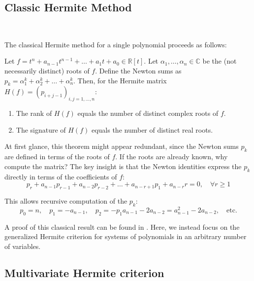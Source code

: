 \documentclass{amsart}
\begin{document}
\vspace{1em}

\subsection{Classic Hermite Method}~

The classical Hermite method for a single polynomial proceeds as follows:

\begin{theorem}
Let $f = t^n + a_{n-1} t^{n-1} + \ldots + a_1 t + a_0 \in \mathbb{R}[t]$. Let $\alpha_1, \ldots, \alpha_n \in \mathbb{C}$ be the (not necessarily distinct) roots of $f$. Define the Newton sums as $p_k = \alpha_1^k + \alpha_2^k + \ldots + \alpha_n^k$. Then, for the Hermite matrix $H(f) = (p_{i+j-1})_{i,j = 1,\ldots,n}$:
\begin{enumerate}
    \item The rank of $H(f)$ equals the number of distinct complex roots of $f$.
    \item The signature of $H(f)$ equals the number of distinct real roots.
\end{enumerate}
\end{theorem}

At first glance, this theorem might appear redundant, since the Newton sums $p_k$ are defined in terms of the roots of $f$. If the roots are already known, why compute the matrix? The key insight is that the Newton identities express the $p_k$ directly in terms of the coefficients of $f$:
\[
p_r + a_{n-1} p_{r-1} + a_{n-2} p_{r-2} + \ldots + a_{n-r+1} p_1 + a_{n-r} r = 0, \quad \forall r \ge 1
\]

This allows recursive computation of the $p_k$:
\[
p_0 = n,\quad p_1 = -a_{n-1},\quad p_2 = -p_1 a_{n-1} - 2a_{n-2} = a_{n-1}^2 - 2a_{n-2},\quad \text{etc.}
\]

A proof of this classical result can be found in \cite[Theorem~4.13, p.~99]{basu_pollack_roy2003book}. Here, we instead focus on the generalized Hermite criterion for systems of polynomials in an arbitrary number of variables.

\vspace{1em}

\subsection{Multivariate Hermite criterion}~
\end{document}
